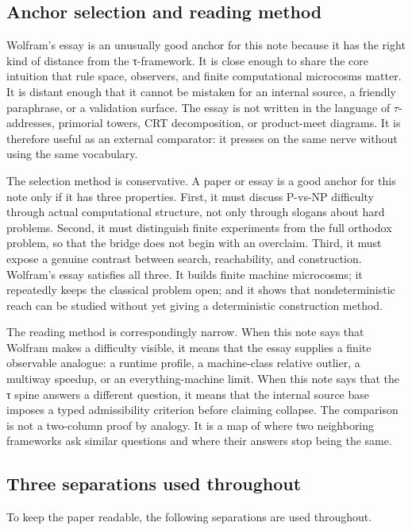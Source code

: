 \documentclass{pantarhei-researchnote}
\begin{document}
\subsection{Anchor selection and reading method}

Wolfram's essay is an unusually good anchor for this note because it has
the right kind of distance from the τ-framework. It is close enough to
share the core intuition that rule space, observers, and finite
computational microcosms matter. It is distant enough that it cannot be
mistaken for an internal source, a friendly paraphrase, or a validation
surface. The essay is not written in the language of \(\tau\)-addresses,
primorial towers, CRT decomposition, or product-meet diagrams. It is
therefore useful as an external comparator: it presses on the same nerve
without using the same vocabulary.

The selection method is conservative. A paper or essay is a good anchor
for this note only if it has three properties. First, it must discuss
P-vs-NP difficulty through actual computational structure, not only
through slogans about hard problems. Second, it must distinguish finite
experiments from the full orthodox problem, so that the bridge does not
begin with an overclaim. Third, it must expose a genuine contrast between
search, reachability, and construction. Wolfram's essay satisfies all
three. It builds finite machine microcosms; it repeatedly keeps the
classical problem open; and it shows that nondeterministic reach can be
studied without yet giving a deterministic construction method.

The reading method is correspondingly narrow. When this note says that
Wolfram makes a difficulty visible, it means that the essay supplies a
finite observable analogue: a runtime profile, a machine-class relative
outlier, a multiway speedup, or an everything-machine limit. When this
note says that the τ spine answers a different question, it means that
the internal source base imposes a typed admissibility criterion before
claiming collapse. The comparison is not a two-column proof by analogy.
It is a map of where two neighboring frameworks ask similar questions and
where their answers stop being the same.

\subsection{Three separations used throughout}

To keep the paper readable, the following separations are used
throughout.
\end{document}
